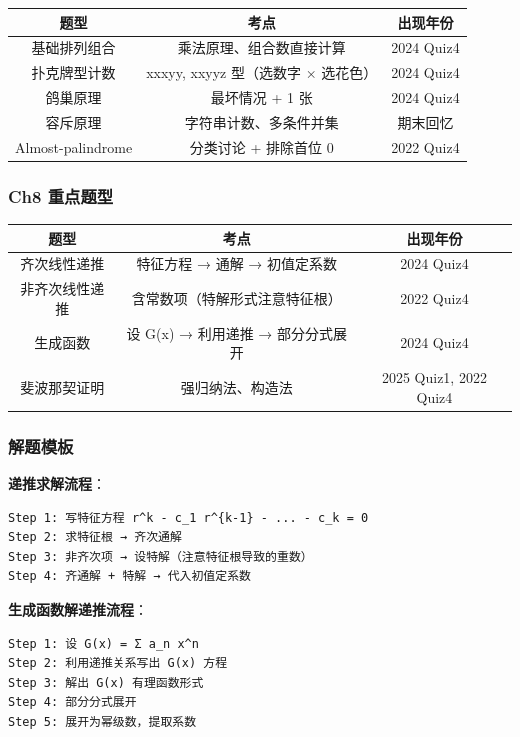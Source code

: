 \documentclass[10pt,a4paper,openany]{ctexbook}
\theoremstyle{definition}
\theoremstyle{remark}
\begin{document}
\begin{center}
\begin{tabular}{ccc}
\hline
题型 & 考点 & 出现年份 \\ \hline
基础排列组合 & 乘法原理、组合数直接计算 & 2024 Quiz4 \\
扑克牌型计数 & xxxyy, xxyyz 型（选数字 × 选花色） & 2024 Quiz4 \\
鸽巢原理 & 最坏情况 + 1 张 & 2024 Quiz4 \\
容斥原理 & 字符串计数、多条件并集 & 期末回忆 \\
Almost-palindrome & 分类讨论 + 排除首位 0 & 2022 Quiz4 \\
\hline
\end{tabular}

\end{center}

\subsubsection{Ch8 重点题型}

\begin{center}
\begin{tabular}{ccc}
\hline
题型 & 考点 & 出现年份 \\ \hline
齐次线性递推 & 特征方程 → 通解 → 初值定系数 & 2024 Quiz4 \\
非齐次线性递推 & 含常数项（特解形式注意特征根） & 2022 Quiz4 \\
生成函数 & 设 G(x) → 利用递推 → 部分分式展开 & 2024 Quiz4 \\
斐波那契证明 & 强归纳法、构造法 & 2025 Quiz1, 2022 Quiz4 \\
\hline
\end{tabular}

\end{center}

\subsubsection{解题模板}

\textbf{递推求解流程}：
{\footnotesize\begin{verbatim}
Step 1: 写特征方程 r^k - c_1 r^{k-1} - ... - c_k = 0
Step 2: 求特征根 → 齐次通解
Step 3: 非齐次项 → 设特解（注意特征根导致的重数）
Step 4: 齐通解 + 特解 → 代入初值定系数
\end{verbatim}}

\textbf{生成函数解递推流程}：
{\footnotesize\begin{verbatim}
Step 1: 设 G(x) = Σ a_n x^n
Step 2: 利用递推关系写出 G(x) 方程
Step 3: 解出 G(x) 有理函数形式
Step 4: 部分分式展开
Step 5: 展开为幂级数，提取系数
\end{verbatim}}
\end{document}
